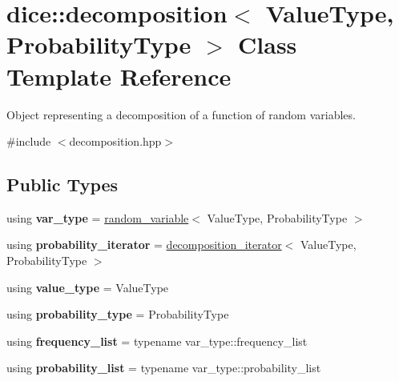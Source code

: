 \hypertarget{classdice_1_1decomposition}{}\section{dice\+:\+:decomposition$<$ Value\+Type, Probability\+Type $>$ Class Template Reference}
\label{classdice_1_1decomposition}


Object representing a decomposition of a function of random variables.  




{\ttfamily \#include $<$decomposition.\+hpp$>$}

\subsection*{Public Types}
\begin{DoxyCompactItemize}
\item 
\mbox{\label{classdice_1_1decomposition_a943670b415a813c050db79c9430d0955}} 
using {\bfseries var\+\_\+type} = \mbox{\hyperlink{classdice_1_1random__variable}{random\+\_\+variable}}$<$ Value\+Type, Probability\+Type $>$
\item 
\mbox{\label{classdice_1_1decomposition_a891387c501eb8b627b5338730f9cf60d}} 
using {\bfseries probability\+\_\+iterator} = \mbox{\hyperlink{classdice_1_1decomposition__iterator}{decomposition\+\_\+iterator}}$<$ Value\+Type, Probability\+Type $>$
\item 
\mbox{\label{classdice_1_1decomposition_aa467b1cad750472097497a3040c7eae5}} 
using {\bfseries value\+\_\+type} = Value\+Type
\item 
\mbox{\label{classdice_1_1decomposition_a74ab5f6f91589c64a5555516ca3edf1f}} 
using {\bfseries probability\+\_\+type} = Probability\+Type
\item 
\mbox{\label{classdice_1_1decomposition_a363def968319171903bb449262f2a4c3}} 
using {\bfseries frequency\+\_\+list} = typename var\+\_\+type\+::frequency\+\_\+list
\item 
\mbox{\label{classdice_1_1decomposition_a4d441672f3a0864e416fb109f42c167b}} 
using {\bfseries probability\+\_\+list} = typename var\+\_\+type\+::probability\+\_\+list
\end{DoxyCompactItemize}
